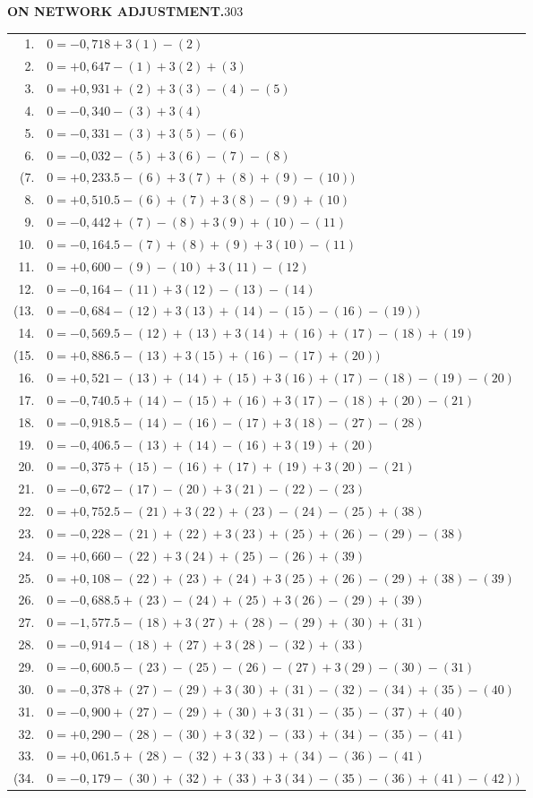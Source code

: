 \newpage
\noindent\textbf{ON NETWORK ADJUSTMENT.}\hfill303
\begingroup
\renewcommand{\arraystretch}{1.16}
\begin{longtable}{@{}r@{\quad}l@{}}
1.&$0=-0{,}718+3(1)-(2)$\\
2.&$0=+0{,}647-(1)+3(2)+(3)$\\
3.&$0=+0{,}931+(2)+3(3)-(4)-(5)$\\
4.&$0=-0{,}340-(3)+3(4)$\\
5.&$0=-0{,}331-(3)+3(5)-(6)$\\
6.&$0=-0{,}032-(5)+3(6)-(7)-(8)$\\
(7.&$0=+0{,}233.5-(6)+3(7)+(8)+(9)-(10))$\\
8.&$0=+0{,}510.5-(6)+(7)+3(8)-(9)+(10)$\\
9.&$0=-0{,}442+(7)-(8)+3(9)+(10)-(11)$\\
10.&$0=-0{,}164.5-(7)+(8)+(9)+3(10)-(11)$\\
11.&$0=+0{,}600-(9)-(10)+3(11)-(12)$\\
12.&$0=-0{,}164-(11)+3(12)-(13)-(14)$\\
(13.&$0=-0{,}684-(12)+3(13)+(14)-(15)-(16)-(19))$\\
14.&$0=-0{,}569.5-(12)+(13)+3(14)+(16)+(17)-(18)+(19)$\\
(15.&$0=+0{,}886.5-(13)+3(15)+(16)-(17)+(20))$\\
16.&$0=+0{,}521-(13)+(14)+(15)+3(16)+(17)-(18)-(19)-(20)$\\
17.&$0=-0{,}740.5+(14)-(15)+(16)+3(17)-(18)+(20)-(21)$\\
18.&$0=-0{,}918.5-(14)-(16)-(17)+3(18)-(27)-(28)$\\
19.&$0=-0{,}406.5-(13)+(14)-(16)+3(19)+(20)$\\
20.&$0=-0{,}375+(15)-(16)+(17)+(19)+3(20)-(21)$\\
21.&$0=-0{,}672-(17)-(20)+3(21)-(22)-(23)$\\
22.&$0=+0{,}752.5-(21)+3(22)+(23)-(24)-(25)+(38)$\\
23.&$0=-0{,}228-(21)+(22)+3(23)+(25)+(26)-(29)-(38)$\\
24.&$0=+0{,}660-(22)+3(24)+(25)-(26)+(39)$\\
25.&$0=+0{,}108-(22)+(23)+(24)+3(25)+(26)-(29)+(38)-(39)$\\
26.&$0=-0{,}688.5+(23)-(24)+(25)+3(26)-(29)+(39)$\\
27.&$0=-1{,}577.5-(18)+3(27)+(28)-(29)+(30)+(31)$\\
28.&$0=-0{,}914-(18)+(27)+3(28)-(32)+(33)$\\
29.&$0=-0{,}600.5-(23)-(25)-(26)-(27)+3(29)-(30)-(31)$\\
30.&$0=-0{,}378+(27)-(29)+3(30)+(31)-(32)-(34)+(35)-(40)$\\
31.&$0=-0{,}900+(27)-(29)+(30)+3(31)-(35)-(37)+(40)$\\
32.&$0=+0{,}290-(28)-(30)+3(32)-(33)+(34)-(35)-(41)$\\
33.&$0=+0{,}061.5+(28)-(32)+3(33)+(34)-(36)-(41)$\\
(34.&$0=-0{,}179-(30)+(32)+(33)+3(34)-(35)-(36)+(41)-(42))$\\
\end{longtable}
